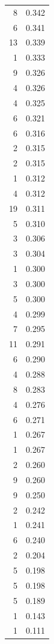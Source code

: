 \begin{tabular}{rr}
8 & 0.342 \\
6 & 0.341 \\
13 & 0.339 \\
1 & 0.333 \\
9 & 0.326 \\
4 & 0.326 \\
4 & 0.325 \\
6 & 0.321 \\
6 & 0.316 \\
2 & 0.315 \\
2 & 0.315 \\
1 & 0.312 \\
4 & 0.312 \\
19 & 0.311 \\
5 & 0.310 \\
3 & 0.306 \\
3 & 0.304 \\
1 & 0.300 \\
3 & 0.300 \\
5 & 0.300 \\
4 & 0.299 \\
7 & 0.295 \\
11 & 0.291 \\
6 & 0.290 \\
4 & 0.288 \\
8 & 0.283 \\
4 & 0.276 \\
6 & 0.271 \\
1 & 0.267 \\
1 & 0.267 \\
2 & 0.260 \\
9 & 0.260 \\
9 & 0.250 \\
2 & 0.242 \\
1 & 0.241 \\
6 & 0.240 \\
2 & 0.204 \\
5 & 0.198 \\
5 & 0.198 \\
5 & 0.189 \\
1 & 0.143 \\
1 & 0.111 \\
\bottomrule
\end{tabular}
